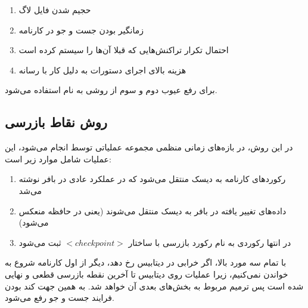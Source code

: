 \begin{enumerate}
    \item حجیم شدن فایل لاگ
    \item زمانگیر بودن جست و جو در کارنامه 
    \item احتمال تکرار تراکنش‌هایی که قبلا آن‌ها را سیستم  کرده است
    \item هزینه‌ بالای اجرای دستورات به دلیل کار با رسانه
\end{enumerate}

برای رفع عیوب دوم و سوم از روشی به نام  استفاده می‌شود.

\subsection{روش نقاط بازرسی}

در این روش، در بازه‌های زمانی منظمی مجموعه عملیاتی توسط  انجام می‌شود،
این عملیات شامل موارد زیر است:

\begin{enumerate}
    \item رکورد‌های کارنامه به دیسک منتقل می‌شود که در عملکرد عادی در بافر نوشته
    می‌شد
    \item داده‌های تغییر یافته در بافر به دیسک منتقل می‌شوند (یعنی در حافظه منعکس می‌شود)
    \item در انتها رکوردی به نام رکورد بازرسی با ساختار $<checkpoint>$ ثبت
    می‌شود
\end{enumerate}

با تمام سه مورد بالا، اگر خرابی در دیتابیس رخ دهد، دیگر از اول کارنامه شروع به
خواندن نمی‌کنیم، زیرا عملیات روی دیتابیس تا آخرین نقطه بازرسی قطعی و نهایی شده
است پس ترمیم مربوط به بخش‌های بعدی آن خواهد شد. به همین جهت کند بودن فرایند جست
و جو رفع می‌شود.